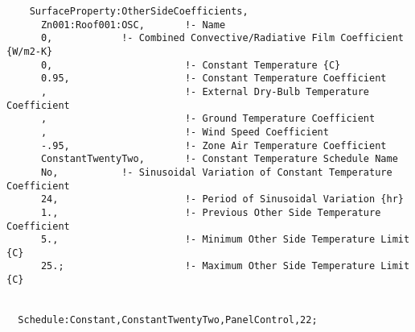 \begin{lstlisting}
    SurfaceProperty:OtherSideCoefficients,
      Zn001:Roof001:OSC,       !- Name
      0,            !- Combined Convective/Radiative Film Coefficient {W/m2-K}
      0,                       !- Constant Temperature {C}
      0.95,                    !- Constant Temperature Coefficient
      ,                        !- External Dry-Bulb Temperature Coefficient
      ,                        !- Ground Temperature Coefficient
      ,                        !- Wind Speed Coefficient
      -.95,                    !- Zone Air Temperature Coefficient
      ConstantTwentyTwo,       !- Constant Temperature Schedule Name
      No,           !- Sinusoidal Variation of Constant Temperature Coefficient
      24,                      !- Period of Sinusoidal Variation {hr}
      1.,                      !- Previous Other Side Temperature Coefficient
      5.,                      !- Minimum Other Side Temperature Limit {C}
      25.;                     !- Maximum Other Side Temperature Limit {C}


  Schedule:Constant,ConstantTwentyTwo,PanelControl,22;
\end{lstlisting}
